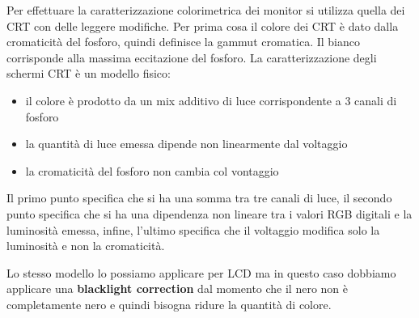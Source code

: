 Per effettuare la caratterizzazione colorimetrica dei monitor si utilizza quella
dei CRT con delle leggere modifiche. Per prima cosa il colore dei CRT è dato dalla 
cromaticità del fosforo, quindi definisce la gammut cromatica. Il bianco corrisponde 
alla massima eccitazione del fosforo. La caratterizzazione degli schermi CRT è un 
modello fisico:
\begin{itemize}
    \item il colore è prodotto da un mix additivo di luce corrispondente a 3 canali 
    di fosforo
    \item la quantità di luce emessa dipende non linearmente dal voltaggio
    \item la cromaticità del fosforo non cambia col vontaggio
\end{itemize} 

Il primo punto specifica che si ha una somma tra tre canali di luce, il secondo 
punto specifica che si ha una dipendenza non lineare tra i valori RGB digitali e 
la luminosità emessa, infine, l'ultimo specifica che il voltaggio modifica solo la 
luminosità e non la cromaticità.

Lo stesso modello lo possiamo applicare per LCD ma in questo caso dobbiamo applicare 
una \textbf{blacklight correction} dal momento che il nero non è completamente nero 
e quindi bisogna ridure la quantità di colore.
